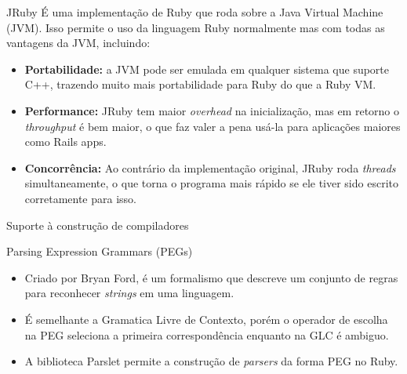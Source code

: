 \documentclass{beamer}
\begin{document}

\begin{frame}{JRuby}
É uma implementação de Ruby que roda sobre a Java Virtual Machine (JVM). Isso permite o uso da linguagem Ruby normalmente mas com todas as vantagens da JVM, incluindo:

\begin{itemize}

\item \textbf{Portabilidade:} a JVM pode ser emulada em qualquer sistema  que suporte C++, trazendo muito mais portabilidade para Ruby do que a Ruby VM.

\item \textbf{Performance:} JRuby tem maior \textit{overhead} na inicialização, mas em retorno o \textit{throughput} é bem maior, o que faz valer a pena usá-la para aplicações maiores como Rails apps.

\item \textbf{Concorrência:} Ao contrário da implementação original, JRuby roda \textit{threads} simultaneamente, o que torna o programa mais rápido se ele tiver sido escrito corretamente para isso.

\end{itemize} 


\end{frame}


\begin{frame}{Suporte à construção de compiladores}

\end{frame}


\begin{frame}{Parsing Expression Grammars (PEGs)}
\begin{itemize}
\item Criado por Bryan Ford, é um formalismo que descreve um conjunto de regras para reconhecer \textit{strings} em uma linguagem.
\item É semelhante a Gramatica Livre de Contexto, porém o operador de escolha na PEG seleciona a primeira correspondência enquanto na GLC é ambiguo.
\item A biblioteca Parslet permite a construção de \textit{parsers} da forma PEG no Ruby.
\end{itemize}
\end{frame}
\end{document}
